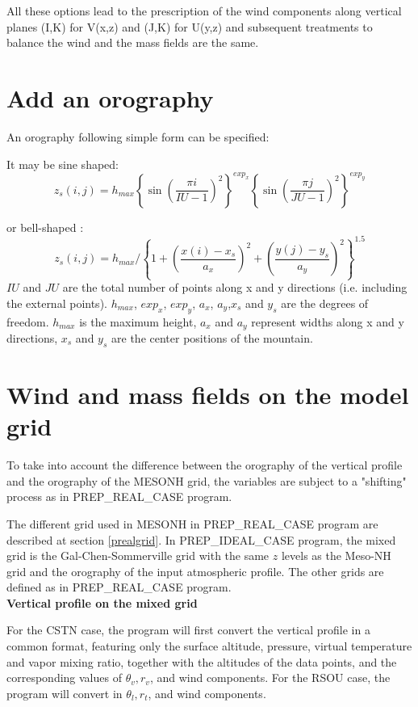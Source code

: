 All these options lead to the prescription of the wind components along vertical
planes (I,K) for V(x,z) and (J,K) for U(y,z) and subsequent treatments
to balance the wind and the mass fields are the same.


\section{Add an orography}

An orography following simple form can be specified:

It may be sine shaped:
$$
z_{s}(i,j) = h_{max} \left\{  \sin \left( \dfrac{\pi i}{IU-1}\right)^{2}
\right\}^{exp_{x}}\left\{  \sin \left( \dfrac{\pi j}{JU-1}\right)^{2}
\right\}^{exp_{y}}
$$

or bell-shaped :
$$
z_{s}(i,j) = h_{max} / \left\{ 1 + \left(\dfrac{x(i) - x_{s}}{a_{x}}\right)^{2}
+ \left(\dfrac{y(j) - y_{s}}{a_{y}}\right)^{2}
\right\}^{1.5}
$$
$IU$ and $JU$ are the total number of points along x and y directions (i.e.
including the external points). $h_{max}$, $exp_{x}$, $exp_{y}$, $a_{x}$,
$a_{y}$,$x_{s}$ and $y_{s}$ are the  degrees of freedom. $h_{max}$ is the maximum
height, $a_{x}$ and
$a_{y}$ represent widths along x and y directions, $x_{s}$ and $y_{s}$  are
the center positions of the mountain.



\section{Wind and mass fields on the model grid}

To take into account the difference between the orography of the vertical profile
 and the orography of the MESONH grid, the variables are subject to a "shifting" process 
as in PREP\_REAL\_CASE program.

The different grid used in MESONH in PREP\_REAL\_CASE program are described at section \ref{prealgrid}.
In PREP\_IDEAL\_CASE program, the mixed grid is the Gal-Chen-Sommerville grid with
the same $\widehat{z}$ levels as the Meso-NH grid and the orography of the input atmospheric profile. 
The other grids are defined as in PREP\_REAL\_CASE program.\\

{\bf Vertical profile on the mixed grid}

For the CSTN case, the program will first convert the vertical profile
 in a common format, featuring only the surface altitude, pressure, virtual
temperature and vapor mixing ratio, together with the altitudes of the
data points, and the corresponding values of $\theta_v, r_v$, and wind
components. For the RSOU case, the program will convert in $\theta_l, r_t$, and wind
components.

